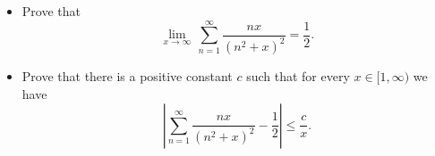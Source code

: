 \begin{itemize}
    \item[(a)] Prove that
    \[ \lim_{x\to \infty}\,\sum_{n=1}^{\infty} \frac{nx}{(n^{2}+x)^{2}}=\frac{1}{2}.\]
    \item[(b)] Prove that there is a positive constant \(c\) such that for every \(x\in [1,\infty)\) we have
    \[\left|\sum_{n=1}^{\infty} \frac{nx}{(n^{2}+x)^{2}}-\frac{1}{2} \right| \leq \frac{c}{x}.\]
\end{itemize}